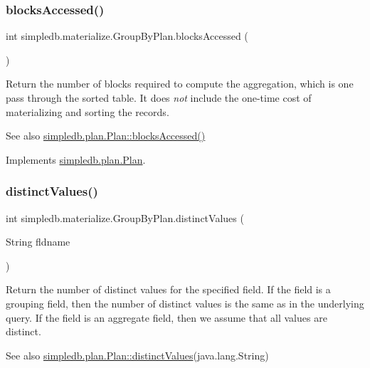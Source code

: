 \subsubsection{\texorpdfstring{blocks\+Accessed()}{blocksAccessed()}}
{\footnotesize\ttfamily int simpledb.\+materialize.\+Group\+By\+Plan.\+blocks\+Accessed (\begin{DoxyParamCaption}{ }\end{DoxyParamCaption})\hspace{0.3cm}{\ttfamily [inline]}}

Return the number of blocks required to compute the aggregation, which is one pass through the sorted table. It does {\itshape not} include the one-\/time cost of materializing and sorting the records. \begin{DoxySeeAlso}{See also}
\hyperlink{interfacesimpledb_1_1plan_1_1Plan_a6a333b95b956fe224812155b9d1c8202}{simpledb.\+plan.\+Plan\+::blocks\+Accessed()} 
\end{DoxySeeAlso}


Implements \hyperlink{interfacesimpledb_1_1plan_1_1Plan_a6a333b95b956fe224812155b9d1c8202}{simpledb.\+plan.\+Plan}.

\mbox{\label{classsimpledb_1_1materialize_1_1GroupByPlan_ac7d2a7c034341a5c032a1247a297ec1e}} 
\subsubsection{\texorpdfstring{distinct\+Values()}{distinctValues()}}
{\footnotesize\ttfamily int simpledb.\+materialize.\+Group\+By\+Plan.\+distinct\+Values (\begin{DoxyParamCaption}\item[{String}]{fldname }\end{DoxyParamCaption})\hspace{0.3cm}{\ttfamily [inline]}}

Return the number of distinct values for the specified field. If the field is a grouping field, then the number of distinct values is the same as in the underlying query. If the field is an aggregate field, then we assume that all values are distinct. \begin{DoxySeeAlso}{See also}
\hyperlink{interfacesimpledb_1_1plan_1_1Plan_a55094c16c756b0c09b5c71b94d573271}{simpledb.\+plan.\+Plan\+::distinct\+Values}(java.\+lang.\+String) 
\end{DoxySeeAlso}


